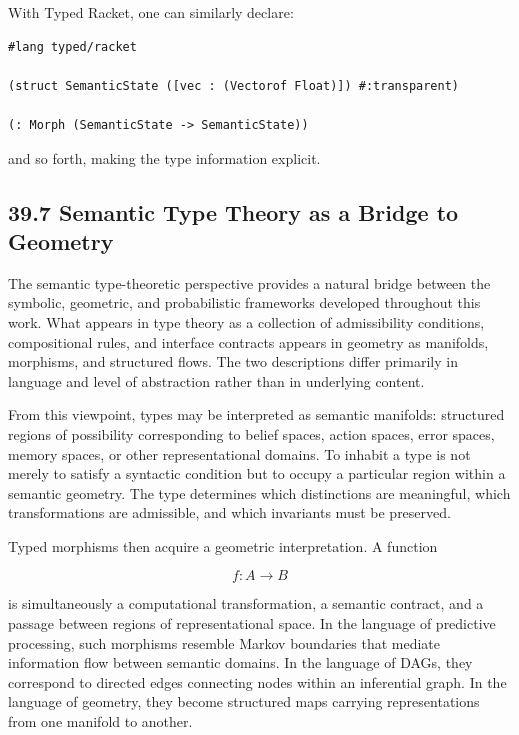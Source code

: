 \documentclass[12pt,letterpaper]{article}
\theoremstyle{remark}
\begin{document}
With Typed Racket, one can similarly declare:

\begin{verbatim}
#lang typed/racket

(struct SemanticState ([vec : (Vectorof Float)]) #:transparent)

(: Morph (SemanticState -> SemanticState))
\end{verbatim}

and so forth, making the type information explicit.

\subsection{39.7 Semantic Type Theory as a Bridge to Geometry}

The semantic type-theoretic perspective provides a natural bridge between the symbolic, geometric, and probabilistic frameworks developed throughout this work. What appears in type theory as a collection of admissibility conditions, compositional rules, and interface contracts appears in geometry as manifolds, morphisms, and structured flows. The two descriptions differ primarily in language and level of abstraction rather than in underlying content.

From this viewpoint, types may be interpreted as semantic manifolds: structured regions of possibility corresponding to belief spaces, action spaces, error spaces, memory spaces, or other representational domains. To inhabit a type is not merely to satisfy a syntactic condition but to occupy a particular region within a semantic geometry. The type determines which distinctions are meaningful, which transformations are admissible, and which invariants must be preserved.

Typed morphisms then acquire a geometric interpretation. A function

\[
f : A \to B
\]

is simultaneously a computational transformation, a semantic contract, and a passage between regions of representational space. In the language of predictive processing, such morphisms resemble Markov boundaries that mediate information flow between semantic domains. In the language of DAGs, they correspond to directed edges connecting nodes within an inferential graph. In the language of geometry, they become structured maps carrying representations from one manifold to another.
\end{document}
